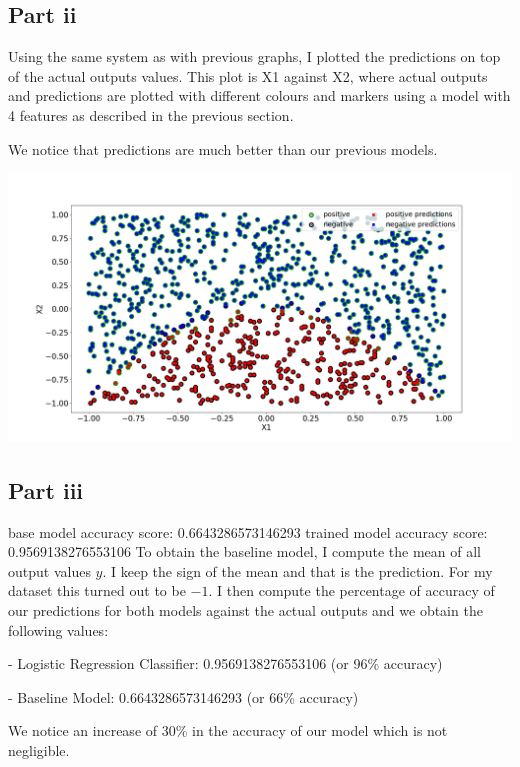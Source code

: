 \documentclass[10pt]{article}
\begin{document}
\subsection*{Part ii}
Using the same system as with previous graphs, I plotted
the predictions on top of the actual outputs values. This
plot is X1 against X2, where actual outputs and predictions are
plotted with different colours and markers using a model with 4 features
as described in the previous section.


We notice that predictions are much better than our previous models.

\includegraphics[scale=0.245]{Figure_3.png}


\subsection*{Part iii}
base model accuracy score:  0.6643286573146293
trained model accuracy score:  0.9569138276553106
To obtain the baseline model, I compute the mean of all output values
$y$. I keep the sign of the mean and that is the prediction. For my dataset this
turned out to be $-1$.
I then compute the percentage of accuracy of our predictions for both 
models against the actual outputs and we obtain the following values:


- Logistic Regression Classifier: 0.9569138276553106 (or 96\% accuracy)

- Baseline Model: 0.6643286573146293 (or 66\% accuracy)

We notice an increase of 30\% in the accuracy of our model which is not negligible.
\end{document}

